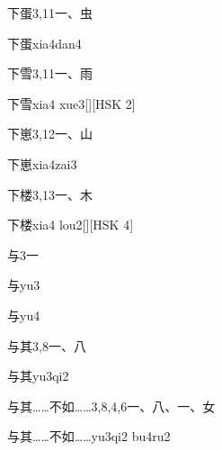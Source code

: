 \begin{entry}{下蛋}{3,11}{⼀、⾍}
  \begin{phonetics}{下蛋}{xia4dan4}
  \end{phonetics}
\end{entry}

\begin{entry}{下雪}{3,11}{⼀、⾬}
  \begin{phonetics}{下雪}{xia4 xue3}[][HSK 2]
  \end{phonetics}
\end{entry}

\begin{entry}{下崽}{3,12}{⼀、⼭}
  \begin{phonetics}{下崽}{xia4zai3}
  \end{phonetics}
\end{entry}

\begin{entry}{下楼}{3,13}{⼀、⽊}
  \begin{phonetics}{下楼}{xia4 lou2}[][HSK 4]
  \end{phonetics}
\end{entry}

\begin{entry}{与}{3}{⼀}
  \begin{phonetics}{与}{yu3}
  \end{phonetics}
  \begin{phonetics}{与}{yu4}
  \end{phonetics}
\end{entry}

\begin{entry}{与其}{3,8}{⼀、⼋}
  \begin{phonetics}{与其}{yu3qi2}
  \end{phonetics}
\end{entry}

\begin{entry}{与其……不如……}{3,8,4,6}{⼀、⼋、⼀、⼥}
  \begin{phonetics}{与其……不如……}{yu3qi2 bu4ru2}
  \end{phonetics}
\end{entry}

